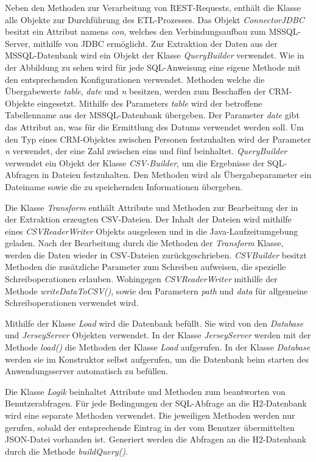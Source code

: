 Neben den Methoden zur Verarbeitung von REST-Requests, enthält die Klasse alle Objekte zur Durchführung des ETL-Prozesses. Das Objekt  \textit{ConnectorJDBC} besitzt ein Attribut namens \textit{con}, welches den Verbindungsaufbau zum MSSQL-Server, mithilfe von JDBC ermöglicht. Zur Extraktion der Daten aus der MSSQL-Datenbank wird ein Objekt der Klasse \textit{QueryBuilder} verwendet. Wie in der Abbildung zu sehen wird für jede SQL-Anweisung eine eigene Methode mit den entsprechenden Konfigurationen verwendet. Methoden welche die Übergabewerte \textit{table}, \textit{date} und \textit{n} besitzen, werden zum Beschaffen der CRM-Objekte eingesetzt. Mithilfe des Parameters \textit{table} wird der betroffene Tabellenname aus der MSSQL-Datenbank übergeben. Der Parameter \textit{date} gibt das Attribut an, was für die Ermittlung des Datums verwendet werden soll. Um den Typ eines CRM-Objektes zwischen Personen festzuhalten wird der Parameter \textit{n} verwendet, der eine Zahl zwischen eins und fünf beinhaltet. \textit{QueryBuilder} verwendet ein Objekt der Klasse \textit{CSV-Builder}, um die Ergebnisse der SQL-Abfragen in Dateien festzuhalten. Den Methoden wird als Übergabeparameter ein Dateiname sowie die zu speichernden Informationen übergeben.

Die Klasse \textit{Transform} enthält Attribute und Methoden zur Bearbeitung der in der Extraktion erzeugten CSV-Dateien. Der Inhalt der Dateien wird mithilfe eines \textit{CSVReaderWriter} Objekts ausgelesen und in die Java-Laufzeitumgebung geladen. Nach der Bearbeitung durch die Methoden der \textit{Transform} Klasse, werden die Daten wieder in CSV-Dateien zurückgeschrieben. \textit{CSVBuilder} besitzt Methoden die zusätzliche Parameter zum Schreiben aufweisen, die spezielle Schreiboperationen erlauben. Wohingegen \textit{CSVReaderWriter} mithilfe der Methode \textit{writeDataToCSV()}, sowie den Parametern \textit{path} und \textit{data} für allgemeine Schreiboperationen verwendet wird.

Mithilfe der Klasse \textit{Load} wird die Datenbank befüllt. Sie wird von den \textit{Database} und \textit{JerseyServer} Objekten verwendet. In der Klasse \textit{JerseyServer} werden mit der Methode \textit{load()} die Methoden der Klasse \textit{Load} aufgerufen. In der Klasse \textit{Database} werden sie im Konstruktor selbst aufgerufen, um die Datenbank beim starten des Anwendungsserver automatisch zu befüllen. 

Die Klasse \textit{Logik} beinhaltet Attribute und Methoden zum beantworten von Benutzerabfragen. Für jede Bedingungen der SQL-Abfrage an die H2-Datenbank wird eine separate Methoden verwendet. Die jeweiligen Methoden werden nur gerufen, sobald der entsprechende Eintrag in der vom Benutzer übermittelten JSON-Datei vorhanden ist. Generiert werden die Abfragen an die H2-Datenbank durch die Methode \textit{buildQuery()}. 

